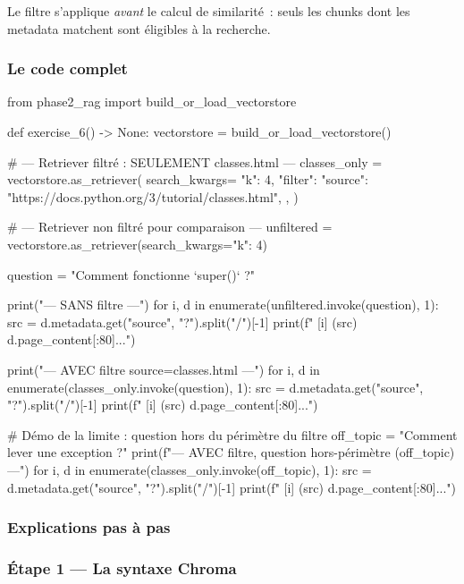 \documentclass[11pt,a4paper]{article}
\begin{document}
Le filtre s'applique \emph{avant} le calcul de similarité~: seuls les
chunks dont les metadata matchent sont éligibles à la recherche.

\subsubsection{Le code complet}

\begin{pythoncode}
from phase2_rag import build_or_load_vectorstore


def exercise_6() -> None:
    vectorstore = build_or_load_vectorstore()

    # --- Retriever filtré : SEULEMENT classes.html ---
    classes_only = vectorstore.as_retriever(
        search_kwargs={
            "k": 4,
            "filter": {"source": "https://docs.python.org/3/tutorial/classes.html"},
        },
    )

    # --- Retriever non filtré pour comparaison ---
    unfiltered = vectorstore.as_retriever(search_kwargs={"k": 4})

    question = "Comment fonctionne `super()` ?"

    print("--- SANS filtre ---")
    for i, d in enumerate(unfiltered.invoke(question), 1):
        src = d.metadata.get("source", "?").split("/")[-1]
        print(f"  [{i}] ({src}) {d.page_content[:80]}...")

    print("\n--- AVEC filtre source=classes.html ---")
    for i, d in enumerate(classes_only.invoke(question), 1):
        src = d.metadata.get("source", "?").split("/")[-1]
        print(f"  [{i}] ({src}) {d.page_content[:80]}...")

    # Démo de la limite : question hors du périmètre du filtre
    off_topic = "Comment lever une exception ?"
    print(f"\n--- AVEC filtre, question hors-périmètre ({off_topic}) ---")
    for i, d in enumerate(classes_only.invoke(off_topic), 1):
        src = d.metadata.get("source", "?").split("/")[-1]
        print(f"  [{i}] ({src}) {d.page_content[:80]}...")
\end{pythoncode}

\subsubsection{Explications pas à pas}

\subsubsection*{Étape 1 — La syntaxe Chroma}
\end{document}

